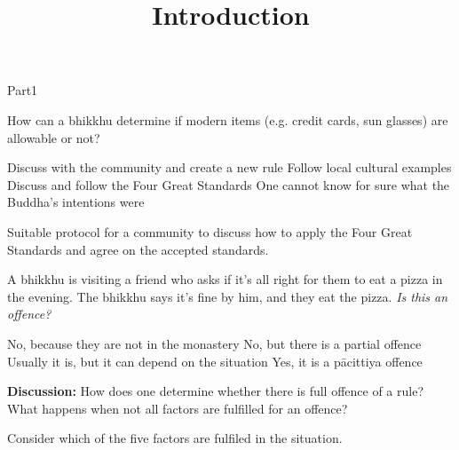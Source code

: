 \documentclass[11pt,oneside]{memoir}
\title{Introduction}
\date{\the\year}
\begin{document}
\maketitle

\begin{exam}{Part1}

\begin{problem}

  How can a bhikkhu determine if modern items (e.g. credit cards, sun glasses) are allowable or not?

  \bigskip

  \begin{answers}{1}
    \bChoices
     Discuss with the community and create a new rule\eAns
     Follow local cultural examples\eAns
     Discuss and follow the Four Great Standards\eAns
     One cannot know for sure what the Buddha's intentions were\eAns
    \eChoices
  \end{answers}

  \begin{solution}
    Suitable protocol for a community to discuss how to apply the Four Great
    Standards and agree on the accepted standards.
  \end{solution}

\end{problem}

\problemDivide

\begin{problem}

  A bhikkhu is visiting a friend who asks if it's all right for them to eat a
  pizza in the evening. The bhikkhu says it's fine by him, and they eat the pizza.
  \emph{Is this an offence?}

  \bigskip

  \begin{answers}{1}
    \bChoices
     No, because they are not in the monastery\eAns
     No, but there is a partial offence\eAns
     Usually it is, but it can depend on the situation\eAns
     Yes, it is a pācittiya offence\eAns
    \eChoices
  \end{answers}

  \bigskip

  \textbf{Discussion:} How does one determine whether there is full offence of a
  rule? What happens when not all factors are fulfilled for an offence?

  \begin{solution}
    Consider which of the five factors are fulfiled in the situation.
  \end{solution}


\end{problem}
\end{exam}
\end{document}
